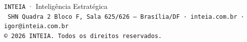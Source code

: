 \documentclass[a4paper,11pt]{article}
\begin{document}

\vfill

\vspace{0.5em}
\begin{center}
  {\fontsize{7}{8}\selectfont\texttt{\color{gold}\uppercase{INTEIA}} \color{dim}· Inteligência Estratégica}\\[0.3em]
  {\fontsize{6}{7}\selectfont\color{dim}\texttt{%
    SHN Quadra 2 Bloco F, Sala 625/626 — Brasília/DF · inteia.com.br · igor@inteia.com.br%
  }}\\[0.2em]
  {\fontsize{5.5}{6}\selectfont\color{dim}\texttt{© 2026 INTEIA. Todos os direitos reservados.}}
\end{center}
\end{document}
